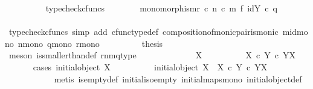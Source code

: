\begin{isabellebody}
\ \ \ \ \ \ \ \ \isamarkupfalse%
\ typecheck{\isacharunderscore}{\kern0pt}cfuncs\isanewline
\ \ \ \ \ \ \isamarkupfalse%
\ {\isachardoublequoteopen}monomorphism{\isacharparenleft}{\kern0pt}r\ {\isasymcirc}\isactrlsub c\ n\ {\isasymcirc}\isactrlsub c\ {\isacharparenleft}{\kern0pt}m\ {\isasymtimes}\isactrlsub f\ id{\isacharparenleft}{\kern0pt}Y{\isacharparenright}{\kern0pt}{\isacharparenright}{\kern0pt}\ {\isasymcirc}\isactrlsub c\ q{\isacharparenright}{\kern0pt}{\isachardoublequoteclose}\isanewline
\ \ \ \ \ \ \ \ \isamarkupfalse%
\ {\isacharparenleft}{\kern0pt}typecheck{\isacharunderscore}{\kern0pt}cfuncs{\isacharcomma}{\kern0pt}\ simp\ add{\isacharcolon}{\kern0pt}\ cfunc{\isacharunderscore}{\kern0pt}type{\isacharunderscore}{\kern0pt}def\ composition{\isacharunderscore}{\kern0pt}of{\isacharunderscore}{\kern0pt}monic{\isacharunderscore}{\kern0pt}pair{\isacharunderscore}{\kern0pt}is{\isacharunderscore}{\kern0pt}monic\ m{\isacharunderscore}{\kern0pt}id{\isacharunderscore}{\kern0pt}mono\ n{\isacharunderscore}{\kern0pt}mono\ q{\isacharunderscore}{\kern0pt}mono\ r{\isacharunderscore}{\kern0pt}mono{\isacharparenright}{\kern0pt}\isanewline
\ \ \ \ \ \ \isamarkupfalse%
\ \isamarkupfalse%
\ {\isacharquery}{\kern0pt}thesis\isanewline
\ \ \ \ \ \ \ \ \isamarkupfalse%
\ {\isacharparenleft}{\kern0pt}meson\ is{\isacharunderscore}{\kern0pt}smaller{\isacharunderscore}{\kern0pt}than{\isacharunderscore}{\kern0pt}def\ rnmq{\isacharunderscore}{\kern0pt}type{\isacharparenright}{\kern0pt}\isanewline
\ \ \ \ \isamarkupfalse%
\isanewline
\ \ \ \ \ \ \isamarkupfalse%
\ {\isachardoublequoteopen}{\isasymnot}\ X\ {\isasymcong}\ {\isasymOmega}{\isachardoublequoteclose}\isanewline
\ \ \ \ \ \ \isamarkupfalse%
\ {\isachardoublequoteopen}X\ {\isasymtimes}\isactrlsub c\ Y\ {\isasymle}\isactrlsub c\ Y\isactrlbsup X\isactrlesup {\isachardoublequoteclose}\isanewline
\ \ \ \ \ \ \isamarkupfalse%
{\isacharparenleft}{\kern0pt}cases\ {\isachardoublequoteopen}initial{\isacharunderscore}{\kern0pt}object\ X{\isachardoublequoteclose}{\isacharparenright}{\kern0pt}\isanewline
\ \ \ \ \ \ \ \ \isamarkupfalse%
\ {\isachardoublequoteopen}initial{\isacharunderscore}{\kern0pt}object\ X\ {\isasymLongrightarrow}\ X\ {\isasymtimes}\isactrlsub c\ Y\ {\isasymle}\isactrlsub c\ Y\isactrlbsup X\isactrlesup {\isachardoublequoteclose}\isanewline
\ \ \ \ \ \ \ \ \ \ \isamarkupfalse%
\ {\isacharparenleft}{\kern0pt}metis\ is{\isacharunderscore}{\kern0pt}empty{\isacharunderscore}{\kern0pt}def\ initial{\isacharunderscore}{\kern0pt}iso{\isacharunderscore}{\kern0pt}empty\ initial{\isacharunderscore}{\kern0pt}maps{\isacharunderscore}{\kern0pt}mono\ initial{\isacharunderscore}{\kern0pt}object{\isacharunderscore}{\kern0pt}def\ \isanewline

\end{isabellebody}
